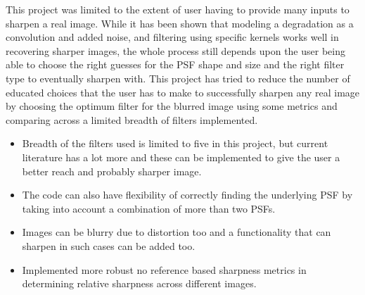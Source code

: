 \noindent This project was limited to the extent of user having to provide many inputs to sharpen a real image. While it has been shown that modeling a degradation as a convolution and added noise, and filtering using specific kernels works well in recovering sharper images, the whole process still depends upon the user being able to choose the right guesses for the PSF shape and size and the right filter type to eventually sharpen with. This project has tried to reduce the number of educated choices that the user has to make to successfully sharpen any real image by choosing the optimum filter for the blurred image using some metrics and comparing across a limited breadth of filters implemented.
\begin{itemize}
\item Breadth of the filters used is limited to five in this project, but current literature has a lot more and these can be implemented to give the user a better reach and probably sharper image. \\
\item The code can also have flexibility of correctly finding the underlying PSF by taking into account a combination of more than two PSFs. \\
\item Images can be blurry due to distortion too and a functionality that can sharpen in such cases can be added too.\\
\item Implemented more robust no reference based sharpness metrics in determining relative sharpness across different images.\\
\end{itemize}











\newpage